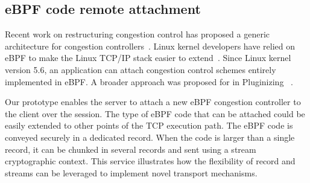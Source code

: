 



\subsection{eBPF code remote attachment}
\label{sec:prot-ebpf}

Recent work on restructuring congestion control has proposed a generic 
architecture for congestion controllers~\cite{narayan2018restructuring}.
Linux kernel developers have relied on eBPF to make the Linux TCP/IP 
stack easier to extend~\cite{brakmo2017tcp,tran2020beyond}. Since Linux kernel 
version 5.6, an application can attach congestion control schemes 
entirely implemented in eBPF. A broader approach was proposed for \quic in 
Pluginizing \quic~\cite{de2019pluginizing}. 

Our \tcpls prototype enables the server %
to attach a new eBPF congestion controller to the client over the \tcpls 
session. The type of eBPF code 
that can be attached could be easily extended to other points of the TCP 
execution path.
The eBPF code is conveyed securely in a dedicated \tcpls record. When 
the code is larger than a single \tls record, it can be chunked in several 
records and sent using a \tcpls stream cryptographic context. This service 
illustrates how the flexibility of \tcpls record and streams can be leveraged 
to implement novel transport mechanisms.

